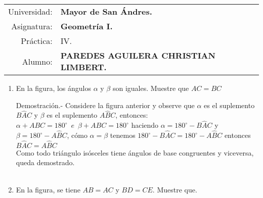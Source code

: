\documentclass[10pt]{article}
\begin{document}
\begin{tabular}{r l }
Universidad: & \textbf{Mayor de San Ándres.}\\
Asignatura: & \textbf{Geometría I.}\\
 Práctica: & IV.\\ 
Alumno: & \textbf{PAREDES AGUILERA CHRISTIAN LIMBERT.}
\end{tabular}
\begin{flushleft}
\end{flushleft}



    \begin{enumerate}

	\item En la figura, los ángulos $\alpha$ y $\beta$ son iguales. Muestre que $AC=BC$\\

	\begin{center}
	\end{center}
    
	Demostración.-\; Considere la figura anterior y observe que $\alpha$ es el suplemento $B\widehat{A}C$ y $\beta$ es el suplemento $A\widehat{B}C$, entonces: $\alpha + ABC = 180^{\circ}\,\,\, e \,\,\, \beta + ABC = 180^{\circ}$ haciendo $\alpha = 180^{\circ} - B\widehat{A}C$ y $\beta = 180^{\circ} - A\widehat{B}C$, cómo $\alpha = \beta$ tenemos $180^{\circ} - B\widehat{A}C = 180^{\circ} - A\widehat{B}C$ entonces $B\widehat{A}C=A\widehat{B}C$\\
	Como todo triángulo isósceles tiene ángulos de base congruentes y viceversa, queda demostrado.\\\\

	\item En la figura, se tiene $AB=AC$ y $BD=CE$. Muestre que.


\end{enumerate}
\end{document}
